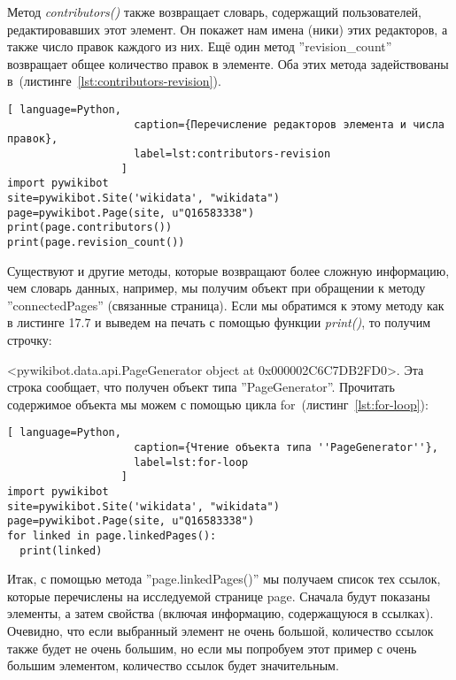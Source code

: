 Метод \textit{contributors()} также возвращает словарь, содержащий пользователей, редактировавших этот элемент. Он покажет нам имена (ники) этих редакторов, а также число правок каждого из них. Ещё один метод ''revision\_count'' возвращает общее количество правок в элементе. Оба этих метода задействованы в~(листинге~\ref{lst:contributors-revision}).

\begin{lstlisting}[ language=Python,
                    caption={Перечисление редакторов элемента и числа правок},
                    label=lst:contributors-revision
                  ]
import pywikibot
site=pywikibot.Site('wikidata', "wikidata")
page=pywikibot.Page(site, u"Q16583338")
print(page.contributors())
print(page.revision_count())
\end{lstlisting}

Существуют и другие методы, которые возвращают более сложную информацию, чем словарь данных, например, мы получим объект при обращении к методу ''connectedPages'' (связанные страница). Если мы обратимся к этому методу как в листинге 17.7 и выведем на печать с помощью функции \textit{print()}, то получим строчку: 

<pywikibot.data.api.PageGenerator object at 0x000002C6C7DB2FD0>.
Эта строка сообщает, что получен объект типа ''PageGenerator''. Прочитать содержимое объекта мы можем с помощью цикла for~(листинг~\ref{lst:for-loop}):

\begin{lstlisting}[ language=Python,
                    caption={Чтение объекта типа ''PageGenerator''},
                    label=lst:for-loop
                  ]
import pywikibot
site=pywikibot.Site('wikidata', "wikidata")
page=pywikibot.Page(site, u"Q16583338")
for linked in page.linkedPages():
  print(linked)
\end{lstlisting}

Итак, с помощью метода ''page.linkedPages()'' мы получаем список тех ссылок, которые перечислены на исследуемой странице page. Сначала будут показаны элементы, а затем свойства (включая информацию, содержащуюся в ссылках). Очевидно, что если выбранный элемент не очень большой, количество ссылок также будет не очень большим, но если мы попробуем этот пример с очень большим элементом, количество ссылок будет значительным.


